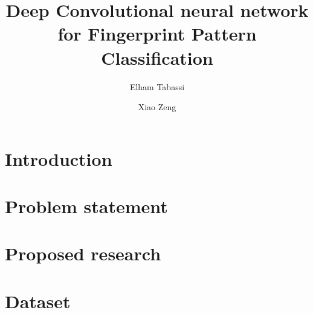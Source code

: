 \documentclass[10pt,twocolumn,letterpaper]{article}
\begin{document}
\title{Deep Convolutional neural network for Fingerprint Pattern Classification}

\author{Elham Tabassi \and Xiao Zeng \\}

\maketitle


%

\section{Introduction}




%

\section{Problem statement}


\section{Proposed research}




\section{Dataset}

\end{document}
